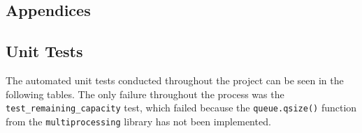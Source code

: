 \documentclass[11pt,a4paper]{report}
\begin{document}
\begin{subappendices}
\renewcommand\thesection{\Alph{section}}
\chapter*{Appendices}

\section{Unit Tests}
\label{appendix:unittests}
The automated unit tests conducted throughout the project can be seen in the following tables. The only failure throughout the process was the \verb+test_remaining_capacity+ test, which failed because the \verb+queue.qsize()+ function from the \verb+multiprocessing+ library has not been implemented.


\end{subappendices}
\end{document}
